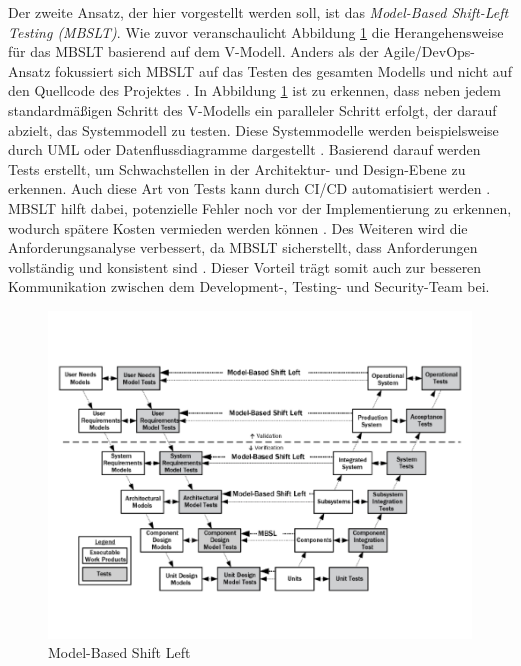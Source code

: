 Der zweite Ansatz, der hier vorgestellt werden soll, ist das \textit{Model-Based Shift-Left Testing (MBSLT)}. Wie zuvor veranschaulicht Abbildung \ref{fig:modelbased} die Herangehensweise für das MBSLT basierend auf dem V-Modell. Anders als der Agile/DevOps-Ansatz fokussiert sich MBSLT auf das Testen des gesamten Modells und nicht auf den Quellcode des Projektes \cite{rani_shift-left_2023}. In Abbildung \ref{fig:modelbased} ist zu erkennen, dass neben jedem standardmäßigen Schritt des V-Modells ein paralleler Schritt erfolgt, der darauf abzielt, das Systemmodell zu testen. Diese Systemmodelle werden beispielsweise durch UML oder Datenflussdiagramme dargestellt \cite{rani_shift-left_2023}. Basierend darauf werden Tests erstellt, um Schwachstellen in der Architektur- und Design-Ebene zu erkennen. Auch diese Art von Tests kann durch CI/CD automatisiert werden \cite{rani_shift-left_2023}. MBSLT hilft dabei, potenzielle Fehler noch vor der Implementierung zu erkennen, wodurch spätere Kosten vermieden werden können \cite{rani_shift-left_2023}. Des Weiteren wird die Anforderungsanalyse verbessert, da MBSLT sicherstellt, dass Anforderungen vollständig und konsistent sind \cite{rani_shift-left_2023}. Dieser Vorteil trägt somit auch zur besseren Kommunikation zwischen dem Development-, Testing- und Security-Team bei.

\begin{figure}
    \centering
    \includegraphics[width=0.9\linewidth]{images/Model_Based_Shift_Left.png}
    \caption{Model-Based Shift Left \cite{firesmith_four_2015}}
    \label{fig:modelbased}
\end{figure}

